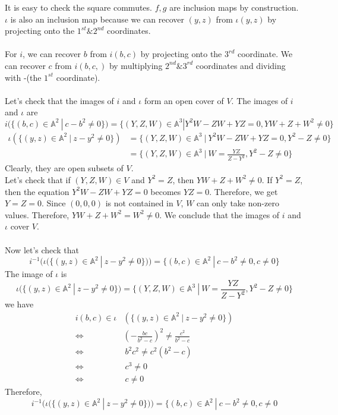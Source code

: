 \begin{example}
It is easy to check the square commutes. $f,g$ are inclusion maps by construction.
$\iota$ is also an inclusion map because we can recover $(y,z)$ from $\iota (y,z)$ by projecting onto the $1^{st}\& 2^{nd}$ coordinates. \\
\bigskip 
\\
For $i$, we can recover $b$ from $i(b,c)$ by projecting onto the $3^{rd}$ coordinate. We can recover $c$ from $i(b,c,)$ by multiplying $2^{nd}\&3^{rd}$ coordinates and dividing with -(the $1^{st}$ coordinate). \\
\bigskip
\\
Let's check that the images of $i$ and $\iota$ form an open cover of $V$. The images of $i$ and $\iota$ are
\[
	i(\{(b,c)\in \mathbb{A}^2~|~c-b^2\neq 0\})=\{(Y,Z,W)\in \mathbb{A}^3| Y^2W-ZW+YZ=0, YW+Z+W^2\neq 0\}
\]
\begin{align*}
	\iota (\{(y,z)\in \mathbb{A}^2~|~z-y^2\neq 0 \})
	&=
	\{(Y,Z,W)\in \mathbb{A}^3 ~|~ Y^2W-ZW+YZ=0,Y^2-Z\neq 0\}\\
	&=
	\{(Y,Z,W)\in \mathbb{A}^3 ~|~ W=\frac{YZ}{Z-Y^2},Y^2-Z\neq 0\}
\end{align*}
Clearly, they are open subsets of $V$.\\
Let's check that if $(Y,Z,W)\in V$ and $Y^2=Z$, then $YW+Z+W^2\neq0$. If $Y^2=Z$, then the equation $Y^2W-ZW+YZ=0$ becomes $YZ=0$. Therefore, we get $Y=Z=0$. Since $(0,0,0)$ is not contained in $V$, $W$ can only take non-zero values. Therefore, $YW+Z+W^2=W^2\neq0$. We conclude that the images of $i$ and $\iota$ cover $V$.\\
\\
Now let's check that 
\[
	i^{-1}(
	\iota (\{(y,z)\in \mathbb{A}^2~|~z-y^2\neq 0 \})
	)
		=
	\{
	(b,c)\in \mathbb{A}^2~|~
	c-b^2\neq 0,c\neq 0 	
	\}
\]
The image of $\iota$ is
\[
	\iota (\{(y,z)\in \mathbb{A}^2~|~z-y^2\neq 0 \})
	=
	\{(Y,Z,W)\in \mathbb{A}^3 ~|~ W=\frac{YZ}{Z-Y^2},Y^2-Z\neq 0\}
\]
we have
\begin{align*}
i(b,c)\in \iota &(\{(y,z)\in \mathbb{A}^2~|~z-y^2\neq 0 \})\\ \Longleftrightarrow &(-\frac{bc}{b^2-c})^2\neq \frac{c^2}{b^2-c}\\
\Longleftrightarrow & ~b^2c^2\neq c^2(b^2-c)\\
\Longleftrightarrow &~c^3\neq 0 \\
\Longleftrightarrow &~c\neq 0
\end{align*}
Therefore,
\[
	i^{-1}(
	\iota (\{(y,z)\in \mathbb{A}^2~|~z-y^2\neq 0 \})
	)
		=
	\{
	(b,c)\in \mathbb{A}^2~|~
	c-b^2\neq 0,c\neq 0 	
\]
\end{example}
